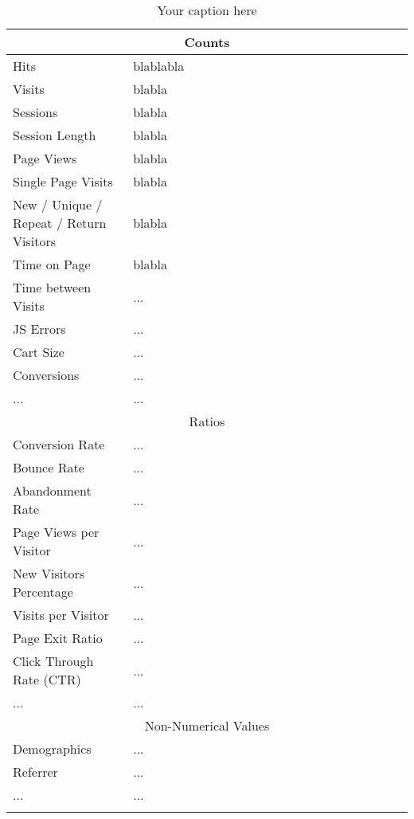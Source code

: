 
\begin{center}
	\small
	\begin{longtable}{ | p{0.3\linewidth} | p{0.7\linewidth} | }
	
	\hline
	\multicolumn{2}{|c|}{Counts} \\
	\hline
	Hits & blablabla \\
	\hline
	Visits & blabla \\
	\hline
	Sessions & blabla \\
	\hline
	Session Length & blabla \\
	\hline
	Page Views & blabla \\
	\hline
	Single Page Visits & blabla \\
	\hline
	New / Unique / Repeat / Return Visitors & blabla \\
	\hline
	Time on Page & blabla \\
	\hline
	Time between Visits & ... \\
	\hline
	JS Errors & ... \\
	\hline
	Cart Size & ... \\
	\hline
	Conversions & ... \\
	\hline
	... & ... \\

	\hline
	\multicolumn{2}{|c|}{Ratios} \\
	\hline
	Conversion Rate & ... \\
	\hline
	Bounce Rate & ... \\
	\hline
	Abandonment Rate & ... \\
	\hline
	Page Views per Visitor & ... \\
	\hline
	New Visitors Percentage & ... \\
	\hline
	Visits per Visitor & ... \\
	\hline
	Page Exit Ratio & ... \\
	\hline
	Click Through Rate (CTR) & ... \\
	\hline
	... & ... \\	
	
	\hline
	\multicolumn{2}{|c|}{Non-Numerical Values} \\
	\hline
	Demographics & ... \\	
	\hline
	Referrer & ... \\	
	\hline
	... & ... \\
	\hline
	
	\caption{Your caption here} %
	\label{tab:businessmetrics}
	\end{longtable}
\end{center}


